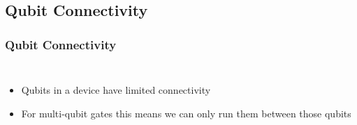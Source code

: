\documentclass[aspectratio=169,11pt,hyperref={colorlinks=true}]{beamer}
\begin{document}
\subsection{Qubit Connectivity}
\begin{frame}
    \frametitle{Qubit Connectivity}
    \begin{columns}
            \begin{itemize}
                \item Qubits in a device have limited connectivity
                \item For multi-qubit gates this means we can only run them
                    between those qubits
            \end{itemize}
            \centering
    \end{columns}
\end{frame}
\end{document}
